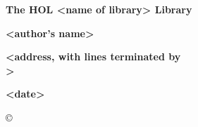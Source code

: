 
\begin{titlepage}

\setcounter{page}{1}		          %


\mbox{}
\vskip20mm
\begin{center}
{\Huge\bf The HOL <name of library> Library}
\end{center}


\vskip15mm
\begin{center}
\large\bf <author's name>
\end{center}


\vfill
\begin{center}
\bf
<address, with lines terminated by \\>
\end{center}


\vskip5mm
\begin{center}
\bf <date>
\end{center}

\end{titlepage}

\thispagestyle{empty}
\mbox{}

\vfill
\begin{center}
\copyright\ <name of copyright holder>
\end{center}
\newpage
